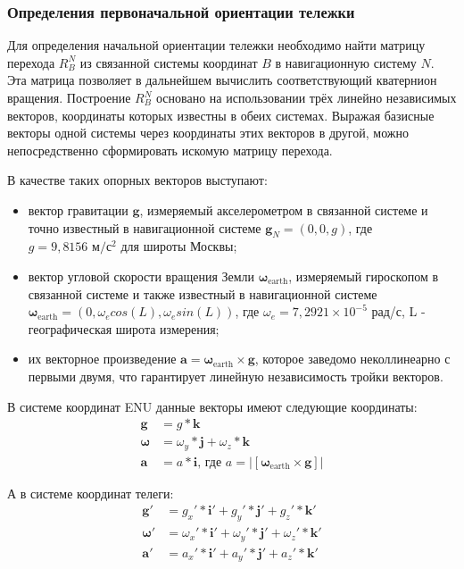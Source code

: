 
\subsubsection{Определения первоначальной ориентации тележки}

Для определения начальной ориентации тележки необходимо найти матрицу перехода $R_{B}^{N}$ из связанной системы координат $B$ в навигационную систему $N$. Эта матрица позволяет в дальнейшем вычислить соответствующий кватернион вращения. Построение $R_{B}^{N}$ основано на использовании трёх линейно независимых векторов, координаты которых известны в обеих системах. Выражая базисные векторы одной системы через координаты этих векторов в другой, можно непосредственно сформировать искомую матрицу перехода.

В качестве таких опорных векторов выступают:
\begin{itemize}
	\item вектор гравитации $\bm{g}$, измеряемый акселерометром в связанной системе и точно известный в навигационной системе $\bm{g}_{N}=(0,0,g)$, где $g = 9,8156 \text{ м}/\text{с}^2$ для широты Москвы;
	\item вектор угловой скорости вращения Земли $\bm{\omega}_{\text{earth}}$, измеряемый гироскопом в связанной системе и также известный в навигационной системе $\bm{\omega}_{\text{earth}} = (0, \omega_{e} cos(L), \omega_{e} sin(L))$, где $\omega_{e} = 7,2921 \times 10^{-5}$ рад/с, L - географическая широта измерения;
	\item их векторное произведение $\bm{a} = \bm{\omega}_{\text{earth}} \times \bm{g}$, которое заведомо неколлинеарно с первыми двумя, что гарантирует линейную независимость тройки векторов.
\end{itemize}


В системе координат ENU данные векторы имеют следующие координаты:
\begin{align*}
	\bm{g} &= g * \bm{k} \\
	\bm{\omega} &= \omega_{y} * \bm{j} + \omega_{z} * \bm{k} \\
	\bm{a} &= a * \bm{i} \text{,\ \ \ \ где $a = \left| \left[ \bm{\omega}_{\text{earth}} \times \bm{g} \right] \right| $}
\end{align*}


А в системе координат телеги:
\begin{align*}
	\bm{g}' &= g_{x}' * \bm{i}' + g_{y}' * \bm{j}' + g_{z}' * \bm{k}' \\
	\bm{\omega}' &= \omega_{x}' * \bm{i}' + \omega_{y}' * \bm{j}' + \omega_{z}' * \bm{k}' \\
	\bm{a}' &= a_{x}' * \bm{i}' + a_{y}' * \bm{j}' + a_{z}' * \bm{k}' \\
\end{align*}


